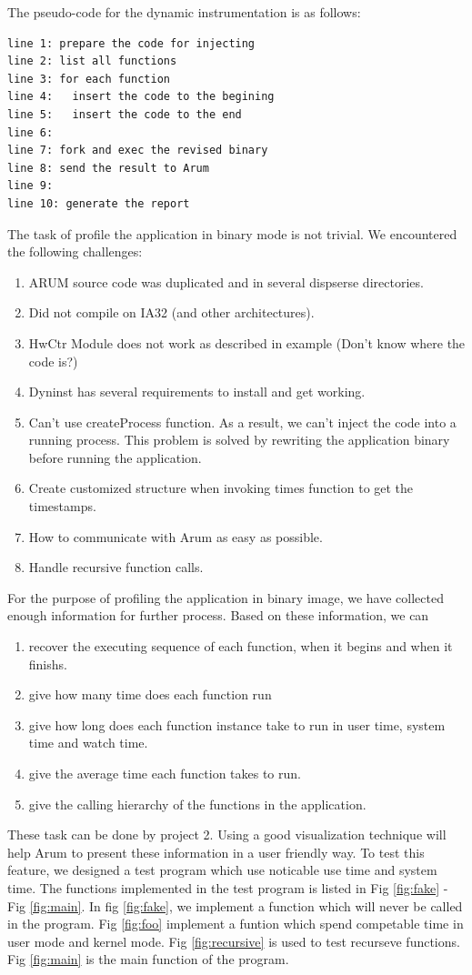 \documentclass[11pt,letterpaper,oneside]{article}
\begin{document}
The pseudo-code for the dynamic instrumentation is as follows:
\begin{Verbatim}[frame=single]
line 1: prepare the code for injecting
line 2: list all functions
line 3: for each function
line 4:   insert the code to the begining
line 5:   insert the code to the end
line 6:
line 7: fork and exec the revised binary
line 8: send the result to Arum
line 9: 
line 10: generate the report
\end{Verbatim}

The task of profile the application in binary mode is not trivial. We encountered the following challenges:
\begin{enumerate}
\item ARUM source code was duplicated and in several dispserse directories.  
\item Did not compile on IA32 (and other architectures).
\item HwCtr Module does not work as described in example (Don't know where the code is?)
\item Dyninst has several requirements to install and get working.
\item Can't use createProcess function. As a result, we can't inject the code into a running process. This problem is solved by rewriting the application binary before running the application.
\item Create customized structure when invoking times function to get the timestamps.
\item How to communicate with Arum as easy as possible.
\item Handle recursive function calls.
\end{enumerate}

For the purpose of profiling the application in binary image, we have collected enough information for further process. Based on these information, we can
\begin{enumerate}
\item recover the executing sequence of each function, when it begins and when it finishs.
\item give how many time does each function run
\item give how long does each function instance take to run in user time, system time and watch time.
\item give the average time each function takes to run.
\item give the calling hierarchy of the functions in the application.
\end{enumerate}
These task can be done by project 2. Using a good visualization technique will help Arum to present these information in a user friendly way.
\newline
To test this feature, we designed a test program which use noticable use time and system time. The functions implemented in the test program is listed in Fig \ref{fig:fake} - Fig \ref{fig:main}. In fig \ref{fig:fake}, we implement a function which will never be called in the program. Fig \ref{fig:foo} implement a funtion which spend competable time in user mode and kernel mode. Fig \ref{fig:recursive} is used to test recurseve functions. Fig \ref{fig:main} is the main function of the program.
\end{document}
